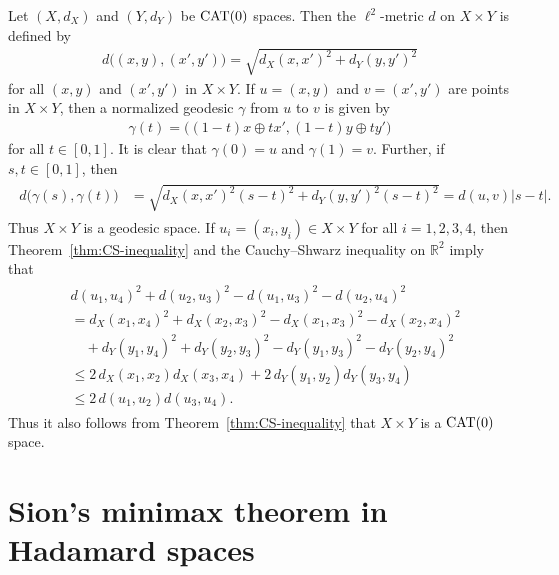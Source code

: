 \documentclass[draft]{amsart}
\numberwithin{equation}{section}
\def\R{\mathbb R}
\providecommand{\abs}[1]{\left\lvert#1\right\rvert}
\newcommand{\CAT}{\textup{CAT}}
\theoremstyle{plain}
\theoremstyle{definition}
\theoremstyle{remark}
\begin{document}
Let $(X,d_X)$ and $(Y,d_Y)$ be $\CAT(0)$ spaces. 
Then the $\ell^2$-metric $d$ on $X\times Y$ is defined by 
\begin{align}%
 d\bigl((x,y),(x',y')\bigr) = 
 \sqrt{d_X(x,x')^2 + d_Y(y,y')^2} 
\end{align}
for all $(x,y)$ and $(x',y')$ in $X\times Y$. 
If $u=(x,y)$ and $v=(x',y')$ are points in $X\times Y$, 
then a normalized geodesic $\gamma$ from $u$ to $v$ 
is given by 
\begin{align}\label{eq:geodesic-product}
 \gamma(t) = \bigl((1-t)x\oplus t x', (1-t)y \oplus t y'\bigr)
\end{align}
for all $t\in [0,1]$. 
It is clear that $\gamma(0)=u$ and $\gamma(1)=v$. 
Further, if $s, t\in [0,1]$, then 
\begin{align}
 \begin{split}
 d\bigl(\gamma(s), \gamma(t)\bigr) 
 &=\sqrt{d_X(x,x')^2(s-t)^2+d_Y(y,y')^2(s-t)^2} 
 =d(u,v) \abs{s-t}.   
 \end{split}
\end{align}
Thus $X\times Y$ is a geodesic space. 
If $u_i=(x_i,y_i) \in X\times Y$ for all $i=1,2,3,4$, 
then Theorem~\ref{thm:CS-inequality} and 
the Cauchy--Shwarz inequality on $\R^2$ imply that 
\begin{align}
 \begin{split}
 &d(u_1,u_4)^2 + d(u_2,u_3)^2 -d(u_1,u_3)^2 -d(u_2,u_4)^2 \\
 &= d_X(x_1,x_4)^2 + d_X(x_2,x_3)^2 -d_X(x_1,x_3)^2 -d_X(x_2,x_4)^2 \\
 &\quad + d_Y(y_1,y_4)^2 + d_Y(y_2,y_3)^2 -d_Y(y_1,y_3)^2 -d_Y(y_2,y_4)^2 \\
 &\leq 2\,d_X(x_1,x_2)d_X(x_3,x_4) + 2\,d_Y(y_1,y_2)d_Y(y_3,y_4) \\
 &\leq 2\,d(u_1,u_2)d(u_3,u_4).   
 \end{split}
\end{align} 
Thus it also follows from Theorem~\ref{thm:CS-inequality} that 
$X\times Y$ is a $\CAT(0)$ space. 

\section{Sion's minimax theorem in Hadamard spaces}\label{sec:Sion}
\end{document}
